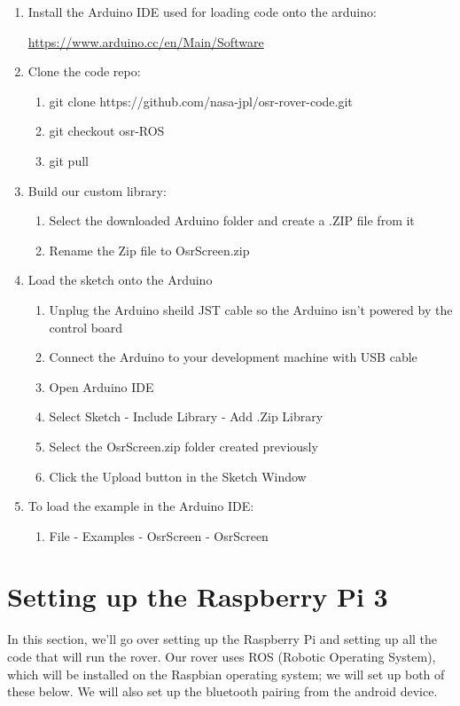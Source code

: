 \documentclass[12pt]{article}
\begin{document}
\begin{enumerate} 
\item Install the Arduino IDE used for loading code onto the arduino:

	\href{https://www.arduino.cc/en/Main/Software}{https://www.arduino.cc/en/Main/Software}

\item Clone the code repo:
	\begin{enumerate}
	\item git clone https://github.com/nasa-jpl/osr-rover-code.git
	\item git checkout osr-ROS
	\item git pull
	\end{enumerate}

\item Build our custom library:
	\begin{enumerate}
	\item Select the downloaded Arduino folder and create a .ZIP file from it
	\item Rename the Zip file to OsrScreen.zip
	\end{enumerate}

\item Load the sketch onto the Arduino
	\begin{enumerate}
	\item Unplug the Arduino sheild JST cable so the Arduino isn't powered by the control board
	\item Connect the Arduino to your development machine with USB cable
	\item Open Arduino IDE
	\item Select Sketch - Include Library - Add .Zip Library 
	\item Select the OsrScreen.zip folder created previously
	\item Click the Upload button in the Sketch Window	
	\end{enumerate}

\item To load the example in the Arduino IDE: 
	\begin{enumerate}
	\item File - Examples - OsrScreen - OsrScreen 
	\end{enumerate}

\end{enumerate}

\section{Setting up the Raspberry Pi 3}
In this section, we'll go over setting up the Raspberry Pi and setting up all the code that will run the rover. Our rover uses ROS (Robotic Operating System), which will be installed on the Raspbian operating system; we will set up both of these below.  We will also set up the bluetooth pairing from the android device.
\end{document}
